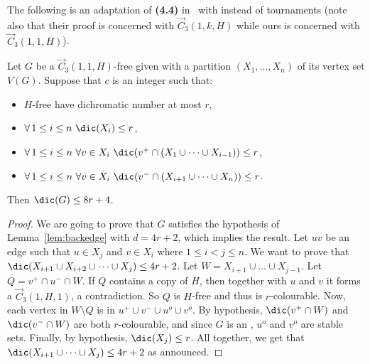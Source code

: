 The following is an adaptation of \textbf{(4.4)} in~\cite{hero} with \omgs instead of tournaments  (note also that their proof is concerned with $\vec C_{3}(1, k, H)$ while ours is concerned with $\vec C_{3}(1, 1, H)$).


\begin{lemma}\label{lem:N+N-backedge}
Let $G$ be a $\vec C_{3}(1, 1, H)$-free  \omg given with a partition $(X_1, \dots, X_n)$ of its vertex set $V(G)$. Suppose that $c$ is an integer such that: 
\begin{itemize}
    
   \item $H$-free \omgs have dichromatic number at most $r$, %
   \item $\forall\, 1 \leq i \leq n\ \dic(X_i) \leq r$,
    \item $\forall\, 1 \leq i\leq n \ \forall v \in X_i \ \dic(v^+ \cap (X_1 \cup \dots \cup X_{i-1})) \leq r$,
    \item $\forall\, 1 \leq i\leq n \ \forall v \in X_i \ \dic(v^- \cap (X_{i+1} \cup \dots \cup X_{n})) \leq r$.
\end{itemize}
Then $\dic(G)\leq 8r+4$. 
\end{lemma}

\begin{proof} 
We are going to prove that $G$ satisfies the hypothesis of Lemma~\ref{lem:backedge} with $d = 4r+2$, which implies the result.   
Let $uv$ be an edge such that $u \in X_j$ and $v \in X_i$ where $1 \leq i < j \leq n$.
We want to prove that $ \dic(X_{i+1} \cup X_{i+2} \cup \dots \cup X_j) \leq 4r+2 $. 
Let $W = X_{i+1} \cup \dots \cup X_{j-1}$. Let $Q = v^+ \cap u^- \cap W$.  If $Q$ contains a copy of $H$, then together with $u$ and $v$ it forms a $\vec C_{3}(1, H, 1)$, a contradiction. So $Q$ is $H$-free and thus is $r$-colourable.
Now, each vertex in $W \setminus Q$ is in $u^+ \cup v^- \cup u^o \cup v^o$. By hypothesis, $\dic(v^+ \cap W)$ and $\dic( v^- \cap W)$ are both $r$-colourable, and since $G$ is an \omg, $u^o$ and $v^o$ are stable sets. Finally, by hypothesis, $\dic(X_j) \leq r$. All together, we get that $\dic( X_{i+1} \cup \dots \cup X_j) \leq 4r+2$ as announced. 

\end{proof}


